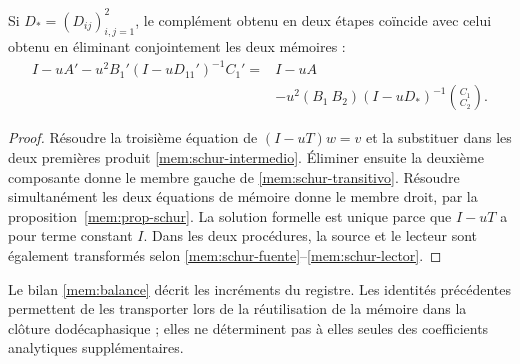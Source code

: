 \begin{proposition}
Si \(D_*=(D_{ij})_{i,j=1}^2\), le complément obtenu en deux étapes
coïncide avec celui obtenu en éliminant conjointement les deux mémoires :
\begin{equation}
 \begin{split}
 I-uA'-u^2B_1'(I-uD_{11}')^{-1}C_1'
 ={}&I-uA\\
 &-u^2(B_1\ B_2)(I-uD_*)^{-1}\binom{C_1}{C_2}.
 \end{split}
 \label{mem:schur-transitivo}
\end{equation}
\end{proposition}
\begin{proof}
Résoudre la troisième équation de \((I-uT)w=v\) et la substituer dans les
deux premières produit \eqref{mem:schur-intermedio}. Éliminer ensuite la
deuxième composante donne le membre gauche de
\eqref{mem:schur-transitivo}. Résoudre simultanément les deux équations de
mémoire donne le membre droit, par la proposition~\ref{mem:prop-schur}.
La solution formelle est unique parce que \(I-uT\) a pour terme constant
\(I\). Dans les deux procédures, la source et
le lecteur sont également transformés selon \eqref{mem:schur-fuente}--\eqref{mem:schur-lector}.
\end{proof}

Le bilan \eqref{mem:balance} décrit les incréments du registre.
Les identités précédentes permettent de les transporter lors de la réutilisation de la mémoire
dans la clôture dodécaphasique ; elles ne déterminent pas à elles seules des coefficients
analytiques supplémentaires.
